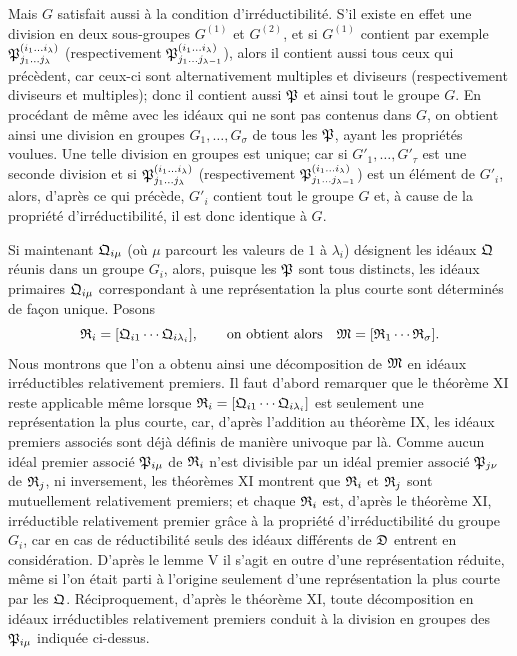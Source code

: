 Mais $G$ satisfait aussi à la condition d'irréductibilité. S'il existe en effet une division en deux sous-groupes $G^{(1)}$ et $G^{(2)}$, et si $G^{(1)}$ contient par exemple $\mathfrak{P}_{j_1\ldots j_\lambda}^{(i_1\ldots i_\lambda)}$ (respectivement $\mathfrak{P}_{j_1\ldots j_{\lambda-1}}^{(i_1\ldots i_\lambda)}$), alors il contient aussi tous ceux qui précèdent, car ceux-ci sont alternativement multiples et diviseurs (respectivement diviseurs et multiples); donc il contient aussi $\mathfrak{P}$ et ainsi tout le groupe $G$. En procédant de même avec les idéaux qui ne sont pas contenus dans $G$, on obtient ainsi une division en groupes $G_1,\ldots,G_\sigma$ de tous les $\mathfrak{P}$, ayant les propriétés voulues. Une telle division en groupes est unique; car si $G'_1,\ldots,G'_\tau$ est une seconde division et si $\mathfrak{P}_{j_1\ldots j_\lambda}^{(i_1\ldots i_\lambda)}$ (respectivement $\mathfrak{P}_{j_1\ldots j_{\lambda-1}}^{(i_1\ldots i_\lambda)}$) est un élément de $G'_i$, alors, d'après ce qui précède, $G'_i$ contient tout le groupe $G$ et, à cause de la propriété d'irréductibilité, il est donc identique à $G$.

Si maintenant $\mathfrak{Q}_{i\mu}$ (où $\mu$ parcourt les valeurs de $1$ à $\lambda_i$) désignent les idéaux $\mathfrak{Q}$ réunis dans un groupe $G_i$, alors, puisque les $\mathfrak{P}$ sont tous distincts, les idéaux primaires $\mathfrak{Q}_{i\mu}$ correspondant à une représentation la plus courte sont déterminés de façon unique. Posons
\[
 \mathfrak{R}_i=[\mathfrak{Q}_{i1}\cdots\mathfrak{Q}_{i\lambda_i}],
 \qquad
 \text{on obtient alors}\quad
 \mathfrak{M}=[\mathfrak{R}_1\cdots\mathfrak{R}_\sigma].
\]
Nous montrons que l'on a obtenu ainsi une décomposition de $\mathfrak{M}$ en idéaux irréductibles relativement premiers. Il faut d'abord remarquer que le théorème XI reste applicable même lorsque $\mathfrak{R}_i=[\mathfrak{Q}_{i1}\cdots\mathfrak{Q}_{i\lambda_i}]$ est seulement une représentation la plus courte, car, d'après l'addition au théorème IX, les idéaux premiers associés sont déjà définis de manière univoque par là. Comme aucun idéal premier associé $\mathfrak{P}_{i\mu}$ de $\mathfrak{R}_i$ n'est divisible par un idéal premier associé $\mathfrak{P}_{j\nu}$ de $\mathfrak{R}_j$, ni inversement, les théorèmes XI montrent que $\mathfrak{R}_i$ et $\mathfrak{R}_j$ sont mutuellement relativement premiers; et chaque $\mathfrak{R}_i$ est, d'après le théorème XI, irréductible relativement premier grâce à la propriété d'irréductibilité du groupe $G_i$, car en cas de réductibilité seuls des idéaux différents de $\mathfrak{D}$ entrent en considération. D'après le lemme V il s'agit en outre d'une représentation réduite, même si l'on était parti à l'origine seulement d'une représentation la plus courte par les $\mathfrak{Q}$. Réciproquement, d'après le théorème XI, toute décomposition en idéaux irréductibles relativement premiers conduit à la division en groupes des $\mathfrak{P}_{i\mu}$ indiquée ci-dessus.

